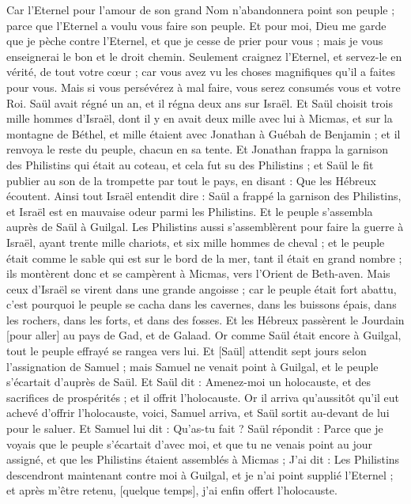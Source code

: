 \begin{multicols}{2}
Car l'Eternel pour l'amour de son grand Nom n'abandonnera point son peuple ; parce que l'Eternel a voulu vous faire son peuple.
Et pour moi, Dieu me garde que je pèche contre l'Eternel, et que je cesse de prier pour vous ; mais je vous enseignerai le bon et le droit chemin.
Seulement craignez l'Eternel, et servez-le en vérité, de tout votre cœur ; car vous avez vu les choses magnifiques qu'il a faites pour vous.
Mais si vous persévérez à mal faire, vous serez consumés vous et votre Roi.
\VerseOne{}Saül avait régné un an, et il régna deux ans sur Israël.
Et Saül choisit trois mille hommes d'Israël, dont il y en avait deux mille avec lui à Micmas, et sur la montagne de Béthel, et mille étaient avec Jonathan à Guébah de Benjamin ; et il renvoya le reste du peuple, chacun en sa tente.
Et Jonathan frappa la garnison des Philistins qui était au coteau, et cela fut su des Philistins ; et Saül le fit publier au son de la trompette par tout le pays, en disant : Que les Hébreux écoutent.
Ainsi tout Israël entendit dire : Saül a frappé la garnison des Philistins, et Israël est en mauvaise odeur parmi les Philistins. Et le peuple s'assembla auprès de Saül à Guilgal.
Les Philistins aussi s'assemblèrent pour faire la guerre à Israël, ayant trente mille chariots, et six mille hommes de cheval ; et le peuple était comme le sable qui est sur le bord de la mer, tant il était en grand nombre ; ils montèrent donc et se campèrent à Micmas, vers l'Orient de Beth-aven.
Mais ceux d'Israël se virent dans une grande angoisse ; car le peuple était fort abattu, c'est pourquoi le peuple se cacha dans les cavernes, dans les buissons épais, dans les rochers, dans les forts, et dans des fosses.
Et les Hébreux passèrent le Jourdain [pour aller] au pays de Gad, et de Galaad. Or comme Saül était encore à Guilgal, tout le peuple effrayé se rangea vers lui.
Et [Saül] attendit sept jours selon l'assignation de Samuel ; mais Samuel ne venait point à Guilgal, et le peuple s'écartait d'auprès de Saül.
Et Saül dit : Amenez-moi un holocauste, et des sacrifices de prospérités ; et il offrit l'holocauste.
Or il arriva qu'aussitôt qu'il eut achevé d'offrir l'holocauste, voici, Samuel arriva, et Saül sortit au-devant de lui pour le saluer.
Et Samuel lui dit : Qu'as-tu fait ? Saül répondit : Parce que je voyais que le peuple s'écartait d'avec moi, et que tu ne venais point au jour assigné, et que les Philistins étaient assemblés à Micmas ;
J'ai dit : Les Philistins descendront maintenant contre moi à Guilgal, et je n'ai point supplié l'Eternel ; et après m'être retenu, [quelque temps], j'ai enfin offert l'holocauste.

\end{multicols}
